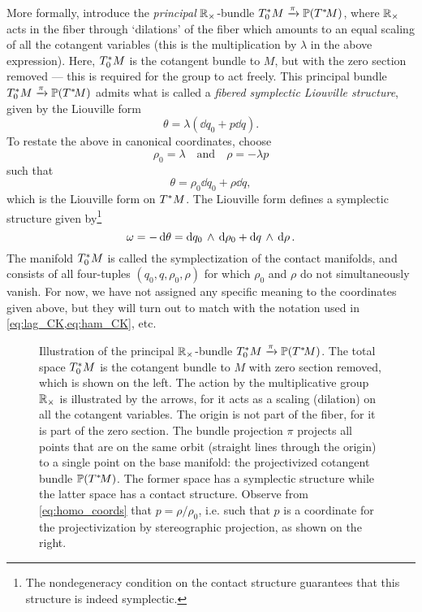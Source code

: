 More formally, introduce the \emph{principal} $\mathbb{R}_{\times}$-bundle $T^*_0M\xrightarrow[]{\pi}\mathbb{P}\qty(T^*\!M)$, where $\mathbb{R}_{\times}$ acts in the fiber through `dilations' of the fiber which amounts to an equal scaling of all the cotangent variables (this is the multiplication by $\lambda$ in the above expression). Here, $T^*_0M$ is the cotangent bundle to $M$, but with the zero section removed --- this is required for the group to act freely. This principal bundle $T^*_0M\xrightarrow[]{\pi}\mathbb{P}\qty(T^*\!M)$ admits what is called a \emph{fibered symplectic Liouville structure}, given by the Liouville form \cite{Libermann1987}
$$ \theta = \lambda ( \dd{q_0} + p \dd{q} ). $$
To restate the above in canonical coordinates, choose
\begin{equation}
    \rho_0 = \lambda \quad \text{and} \quad \rho = -\lambda p
    \label{eq:homo_coords}
\end{equation}
such that
\begin{equation} 
    \theta = \rho_0\dd{q}_0 + \rho\dd{q}, 
    \label{eq:dho_liouville_form}
\end{equation}
which is the Liouville form on $T^*M$. \cite[p. 308]{Libermann1987}  The Liouville form defines a symplectic structure given by\footnote
{The nondegeneracy condition on the contact structure guarantees that this structure is indeed symplectic.}
$$\omega = -\dd{\theta} =  \dd{q_0}\,\wedge\,\dd{\rho_0}  +  \dd{q}\,\wedge\,\dd{\rho} .$$ 
The manifold $T^*_0M$ is called the symplectization of the contact manifolds, and consists of all four-tuples $(q_0, q, \rho_0, \rho)$ for which $\rho_0$ and $\rho$ do not simultaneously vanish. For now, we have not assigned any specific meaning to the coordinates given above, but they will turn out to match with the notation used in \cref{eq:lag_CK,eq:ham_CK}, etc.
\begin{figure}[h!]
    \begin{center}
        
    \end{center}
    \caption{Illustration of the principal $\mathbb{R}_{\times}$-bundle $T^*_0M\xrightarrow[]{\pi}\mathbb{P}\qty(T^*\!M)$. The total space $T^*_0M$ is the cotangent bundle to $M$ with zero section removed, which is shown on the left. The action by the multiplicative group $\mathbb{R}_{\times}$ is illustrated by the arrows, for it acts as a scaling (dilation) on all the cotangent variables. The origin is not part of the fiber, for it is part of the zero section. The bundle projection $\pi$ projects all points that are on the same orbit (straight lines through the origin) to a single point on the base manifold: the projectivized cotangent bundle $\mathbb{P}\qty(T^*\!M)$. The former space has a symplectic structure while the latter space has a contact structure. Observe from \cref{eq:homo_coords} that $p = \rho/\rho_0$, i.e. such that $p$ is a coordinate for the projectivization by stereographic projection, as shown on the right.}
    \label{fig:principal_bundle}
\end{figure}


